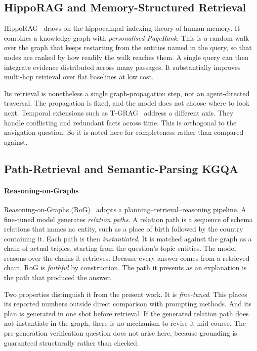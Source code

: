 \subsection{HippoRAG and Memory-Structured Retrieval}

HippoRAG~\cite{gutierrez2024hipporag} draws on the hippocampal indexing theory
of human memory. It combines a knowledge graph with \emph{personalised
PageRank}. This is a random walk over the graph that keeps restarting from the
entities named in the query, so that nodes are ranked by how readily the walk
reaches them. A single query can then integrate evidence distributed across many
passages. It substantially improves multi-hop retrieval over flat baselines at
low cost.

Its retrieval is nonetheless a single graph-propagation step, not an
agent-directed traversal. The propagation is fixed, and the model does not
choose where to look next. Temporal extensions such as T-GRAG~\cite{li2025tgrag}
address a different axis. They handle conflicting and redundant facts across
time. This is orthogonal to the navigation question. So it is noted here for
completeness rather than compared against.

\subsection{Path-Retrieval and Semantic-Parsing KGQA}\label{sec:path-kgqa}

\paragraph{Reasoning-on-Graphs}

Reasoning-on-Graphs (RoG)~\cite{luo2024reasoning} adopts a
planning--retrieval--reasoning pipeline. A fine-tuned model generates
\emph{relation paths}. A relation path is a sequence of schema relations that
names no entity, such as a place of birth followed by the country containing it.
Each path is then \emph{instantiated}. It is matched against the graph as a
chain of actual triples, starting from the question's topic entities. The model
reasons over the chains it retrieves. Because every answer comes from a
retrieved chain, RoG is \emph{faithful} by construction. The path it presents as
an explanation is the path that produced the answer.

Two properties distinguish it from the present work. It is \emph{fine-tuned}.
This places its reported numbers outside direct comparison with prompting
methods. And its plan is generated in one shot before retrieval. If the
generated relation path does not instantiate in the graph, there is no mechanism
to revise it mid-course. The pre-generation verification question does not arise
here, because grounding is guaranteed structurally rather than checked.


